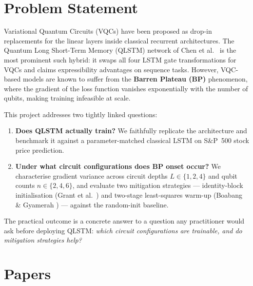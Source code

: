 \documentclass[10pt,twocolumn]{article}
\begin{document}
\section{Problem Statement}

Variational Quantum Circuits (VQCs) have been proposed as drop-in replacements for the linear layers inside classical recurrent architectures. The Quantum Long Short-Term Memory (QLSTM) network of Chen et al.\ \cite{chen2020qlstm} is the most prominent such hybrid: it swaps all four LSTM gate transformations for VQCs and claims expressibility advantages on sequence tasks. However, VQC-based models are known to suffer from the \textbf{Barren Plateau (BP)} phenomenon, where the gradient of the loss function vanishes exponentially with the number of qubits, making training infeasible at scale.

This project addresses two tightly linked questions:
\begin{enumerate}
  \item \textbf{Does QLSTM actually train?} We faithfully replicate the architecture and benchmark it against a parameter-matched classical LSTM on S\&P~500 stock price prediction.
  \item \textbf{Under what circuit configurations does BP onset occur?} We characterise gradient variance across circuit depths $L \in \{1,2,4\}$ and qubit counts $n \in \{2,4,6\}$, and evaluate two mitigation strategies — identity-block initialisation (Grant et al.\ \cite{grant2019init}) and two-stage least-squares warm-up (Boabang \& Gyamerah \cite{boabang2026twostage}) — against the random-init baseline.
\end{enumerate}

The practical outcome is a concrete answer to a question any practitioner would ask before deploying QLSTM: \textit{which circuit configurations are trainable, and do mitigation strategies help?}


\section{Papers}
\end{document}
